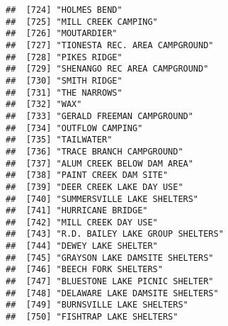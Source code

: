 \documentclass[
]{article}
\begin{document}
\begin{verbatim}
##  [724] "HOLMES BEND"                                                                         
##  [725] "MILL CREEK CAMPING"                                                                  
##  [726] "MOUTARDIER"                                                                          
##  [727] "TIONESTA REC. AREA CAMPGROUND"                                                       
##  [728] "PIKES RIDGE"                                                                         
##  [729] "SHENANGO REC AREA CAMPGROUND"                                                        
##  [730] "SMITH RIDGE"                                                                         
##  [731] "THE NARROWS"                                                                         
##  [732] "WAX"                                                                                 
##  [733] "GERALD FREEMAN CAMPGROUND"                                                           
##  [734] "OUTFLOW CAMPING"                                                                     
##  [735] "TAILWATER"                                                                           
##  [736] "TRACE BRANCH CAMPGROUND"                                                             
##  [737] "ALUM CREEK BELOW DAM AREA"                                                           
##  [738] "PAINT CREEK DAM SITE"                                                                
##  [739] "DEER CREEK LAKE DAY USE"                                                             
##  [740] "SUMMERSVILLE LAKE SHELTERS"                                                          
##  [741] "HURRICANE BRIDGE"                                                                    
##  [742] "MILL CREEK DAY USE"                                                                  
##  [743] "R.D. BAILEY LAKE GROUP SHELTERS"                                                     
##  [744] "DEWEY LAKE SHELTER"                                                                  
##  [745] "GRAYSON LAKE DAMSITE SHELTERS"                                                       
##  [746] "BEECH FORK SHELTERS"                                                                 
##  [747] "BLUESTONE LAKE PICNIC SHELTER"                                                       
##  [748] "DELAWARE LAKE DAMSITE SHELTERS"                                                      
##  [749] "BURNSVILLE LAKE SHELTERS"                                                            
##  [750] "FISHTRAP LAKE SHELTERS"                                                              

\end{verbatim}
\end{document}
